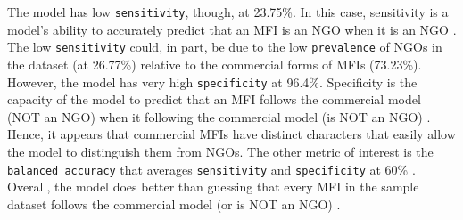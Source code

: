 \documentclass[a4paper,nobind]{templates/ociamthesis}
\begin{document}
The model has low \texttt{sensitivity}, though, at 23.75\%. In this case, sensitivity is a model's ability to accurately predict that an MFI is an NGO when it is an NGO \autocite{marom2010using}. The low \texttt{sensitivity} could, in part, be due to the low \texttt{prevalence} of NGOs in the dataset (at 26.77\%) relative to the commercial forms of MFIs (73.23\%). However, the model has very high \texttt{specificity} at 96.4\%. Specificity is the capacity of the model to predict that an MFI follows the commercial model (NOT an NGO) when it following the commercial model (is NOT an NGO) \autocite{zeng2020confusion}. Hence, it appears that commercial MFIs have distinct characters that easily allow the model to distinguish them from NGOs. The other metric of interest is the \texttt{balanced\ accuracy} that averages \texttt{sensitivity} and \texttt{specificity} at 60\% \autocite{gorzalczany2016multi}. Overall, the model does better than guessing that every MFI in the sample dataset follows the commercial model (or is NOT an NGO) \autocite{hosmer2013applied}.
\end{document}
